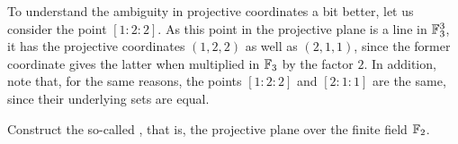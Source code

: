 \begin{example}
To understand the ambiguity in projective coordinates a bit better, let us consider the point $[1:2:2]$. As this point in the projective plane is a line in $\mathbb{F}_3^3$, it has the projective coordinates $(1,2,2)$ as well as $(2,1,1)$, since the former coordinate gives the latter when multiplied in $\mathbb{F}_3$ by the factor $2$. In addition, note that, for the same reasons, the points $[1:2:2]$ and $[2:1:1]$ are the same, since their underlying sets are equal.
\end{example}
\begin{exercise}
Construct the so-called , that is, the projective plane over the finite field $\mathbb{F}_2$.
\end{exercise}
